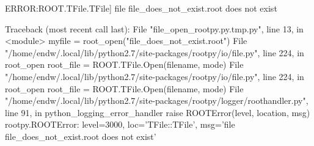 \begin{footnotesize}
\begin{pyglist}[language=text,texcl=true,abovecaptionskip=0,style=bw]
ERROR:ROOT.TFile.TFile] file file_does_not_exist.root does not exist
\end{pyglist}
\end{footnotesize}
\begin{tiny}
\begin{pyglist}[language=text,texcl=true,abovecaptionskip=0,style=bw]
Traceback (most recent call last):
  File "file_open_rootpy.py.tmp.py", line 13, in <module>
    myfile = root_open("file_does_not_exist.root")
  File "/home/endw/.local/lib/python2.7/site-packages/rootpy/io/file.py", line 224, in root_open
    root_file = ROOT.TFile.Open(filename, mode)
  File "/home/endw/.local/lib/python2.7/site-packages/rootpy/io/file.py", line 224, in root_open
    root_file = ROOT.TFile.Open(filename, mode)
  File "/home/endw/.local/lib/python2.7/site-packages/rootpy/logger/roothandler.py", line 91, in python_logging_error_handler
    raise ROOTError(level, location, msg)
rootpy.ROOTError: level=3000, loc='TFile::TFile', msg='file file_does_not_exist.root does not exist'
\end{pyglist}
\end{tiny}
